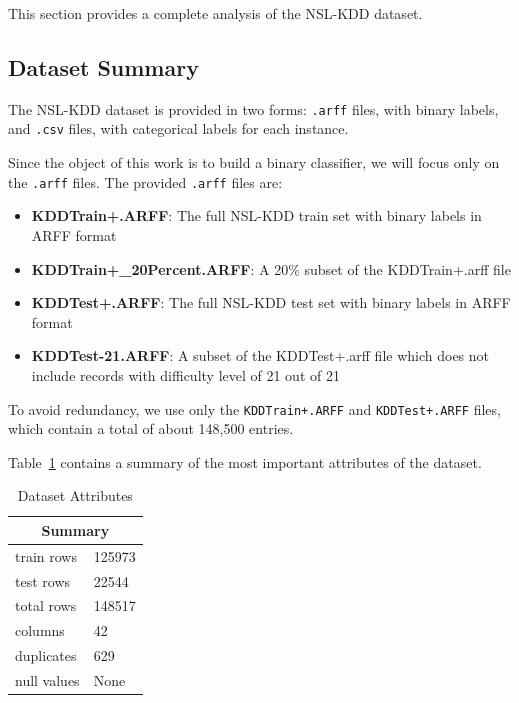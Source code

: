 This section provides a complete analysis of the NSL-KDD dataset.

\subsection{Dataset Summary}

The NSL-KDD dataset is provided in two forms: \texttt{.arff} files, with binary labels, and \texttt{.csv} files, with categorical labels for each instance.

Since the object of this work is to build a binary classifier, we will focus only on the \texttt{.arff} files. The provided \texttt{.arff} files are:

\begin{itemize}
    \item \textbf{KDDTrain+.ARFF}: The full NSL-KDD train set with binary labels in ARFF format
    \item \textbf{KDDTrain+\_20Percent.ARFF}: A 20\% subset of the KDDTrain+.arff file
    \item \textbf{KDDTest+.ARFF}: The full NSL-KDD test set with binary labels in ARFF format
    \item \textbf{KDDTest-21.ARFF}: A subset of the KDDTest+.arff file which does not include records with difficulty level of 21 out of 21
\end{itemize}

To avoid redundancy, we use only the \texttt{KDDTrain+.ARFF} and \texttt{KDDTest+.ARFF} files, which contain a total of about 148,500 entries.

Table~\ref{tab:summ} contains a summary of the most important attributes of the dataset.

\FloatBarrier

\begin{table}[!htb]
    \centering
    
    \begin{tabular}{|l|l|}
    \hline
    \multicolumn{2}{|c|}{\textbf{Summary}} \\ \hline
    train rows              & 125973             \\ \hline
    test rows               & 22544              \\ \hline
    total rows              & 148517             \\ \hline
    columns                 & 42                 \\ \hline
    duplicates              & 629                \\ \hline
    null values             & None               \\ \hline
    \end{tabular}
    \caption{Dataset Attributes}
    \label{tab:summ}
\end{table}
\FloatBarrier

